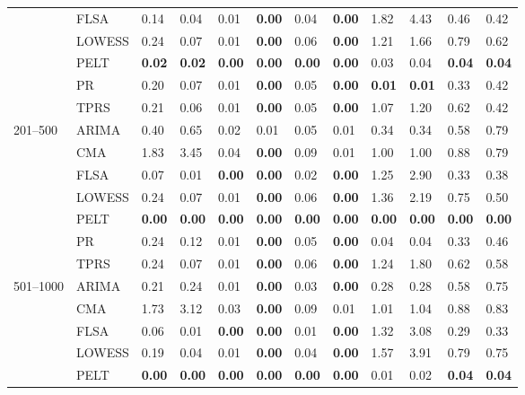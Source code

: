 \begin{table}[ht]
\begin{tabular}{llllllllllll}
   & FLSA & 0.14 & 0.04 & 0.01 & \textbf{0.00} & 0.04 & \textbf{0.00} & 1.82 & 4.43 & 0.46 & 0.42 \\ 
   & LOWESS & 0.24 & 0.07 & 0.01 & \textbf{0.00} & 0.06 & \textbf{0.00} & 1.21 & 1.66 & 0.79 & 0.62 \\ 
   & PELT & \textbf{0.02} & \textbf{0.02} & \textbf{0.00} & \textbf{0.00} & \textbf{0.00} & \textbf{0.00} & 0.03 & 0.04 & \textbf{0.04} & \textbf{0.04} \\ 
   & PR & 0.20 & 0.07 & 0.01 & \textbf{0.00} & 0.05 & \textbf{0.00} & \textbf{0.01} & \textbf{0.01} & 0.33 & 0.42 \\ 
   & TPRS & 0.21 & 0.06 & 0.01 & \textbf{0.00} & 0.05 & \textbf{0.00} & 1.07 & 1.20 & 0.62 & 0.42 \\ 
  201–500 & ARIMA & 0.40 & 0.65 & 0.02 & 0.01 & 0.05 & 0.01 & 0.34 & 0.34 & 0.58 & 0.79 \\ 
   & CMA & 1.83 & 3.45 & 0.04 & \textbf{0.00} & 0.09 & 0.01 & 1.00 & 1.00 & 0.88 & 0.79 \\ 
   & FLSA & 0.07 & 0.01 & \textbf{0.00} & \textbf{0.00} & 0.02 & \textbf{0.00} & 1.25 & 2.90 & 0.33 & 0.38 \\ 
   & LOWESS & 0.24 & 0.07 & 0.01 & \textbf{0.00} & 0.06 & \textbf{0.00} & 1.36 & 2.19 & 0.75 & 0.50 \\ 
   & PELT & \textbf{0.00} & \textbf{0.00} & \textbf{0.00} & \textbf{0.00} & \textbf{0.00} & \textbf{0.00} & \textbf{0.00} & \textbf{0.00} & \textbf{0.00} & \textbf{0.00} \\ 
   & PR & 0.24 & 0.12 & 0.01 & \textbf{0.00} & 0.05 & \textbf{0.00} & 0.04 & 0.04 & 0.33 & 0.46 \\ 
   & TPRS & 0.24 & 0.07 & 0.01 & \textbf{0.00} & 0.06 & \textbf{0.00} & 1.24 & 1.80 & 0.62 & 0.58 \\ 
  501–1000 & ARIMA & 0.21 & 0.24 & 0.01 & \textbf{0.00} & 0.03 & \textbf{0.00} & 0.28 & 0.28 & 0.58 & 0.75 \\ 
   & CMA & 1.73 & 3.12 & 0.03 & \textbf{0.00} & 0.09 & 0.01 & 1.01 & 1.04 & 0.88 & 0.83 \\ 
   & FLSA & 0.06 & 0.01 & \textbf{0.00} & \textbf{0.00} & 0.01 & \textbf{0.00} & 1.32 & 3.08 & 0.29 & 0.33 \\ 
   & LOWESS & 0.19 & 0.04 & 0.01 & \textbf{0.00} & 0.04 & \textbf{0.00} & 1.57 & 3.91 & 0.79 & 0.75 \\ 
   & PELT & \textbf{0.00} & \textbf{0.00} & \textbf{0.00} & \textbf{0.00} & \textbf{0.00} & \textbf{0.00} & 0.01 & 0.02 & \textbf{0.04} & \textbf{0.04} \\ 

\end{tabular}
\end{table}

